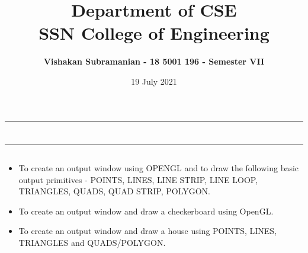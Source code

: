 \documentclass[12pt, a4]{article}
\title{\textbf{Department of CSE\\SSN College of Engineering}}
\author{\textbf{Vishakan Subramanian - 18 5001 196 - Semester VII}}
\date{19 July 2021}
\begin{document}
\maketitle
\hrule
\section*{}
\hrule
\bigskip

\subsection*{}
\subsection*{}
\begin{flushleft}
\begin{itemize}
\item To create an output window using OPENGL and to draw the following basic output primitives - POINTS, LINES, LINE STRIP, LINE LOOP, TRIANGLES, QUADS, QUAD STRIP, POLYGON.
\item To create an output window and draw a checkerboard using OpenGL. 
\item To create an output window and draw a house using POINTS, LINES, TRIANGLES and QUADS/POLYGON.  

\end{itemize}
\end{flushleft}

\newpage
\subsection*{}
\begin{flushleft}

\end{flushleft}

\newpage
\subsection*{}
\begin{flushleft}

\end{flushleft}

\newpage
\subsection*{}
\begin{flushleft}

\end{flushleft}
\end{document}
